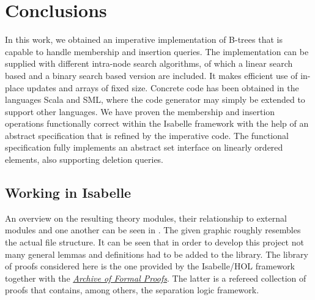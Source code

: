 

\chapter{Conclusions}\label{chapter:conclusion}

In this work, we obtained an imperative implementation
of B-trees that is capable to handle membership and insertion queries.
The implementation can be supplied with different
intra-node search algorithms, of which a linear search based
and a binary search based version are included.
It makes efficient use of in-place updates
and arrays of fixed size.
Concrete code has been obtained in the languages Scala and SML,
where the code generator may simply be extended to support other languages.
We have proven the membership and insertion operations
functionally correct within the Isabelle framework
with the help of an abstract specification
that is refined by the imperative code.
The functional specification fully implements
an abstract set interface on linearly ordered elements,
also supporting deletion queries.

\section{Working in Isabelle}

An overview on the resulting theory modules,
their relationship to external modules and one another
can be seen in .
The given graphic roughly resembles the actual file structure.
It can be seen that in order to develop this project
not many general lemmas and definitions had to be added to the library.
The library of proofs considered here
is the one provided by the Isabelle/HOL framework together with the \href{https://www.isa-afp.org}{\textit{Archive of Formal Proofs}}.
The latter is a refereed collection of proofs that contains, among others,
the separation logic framework.

